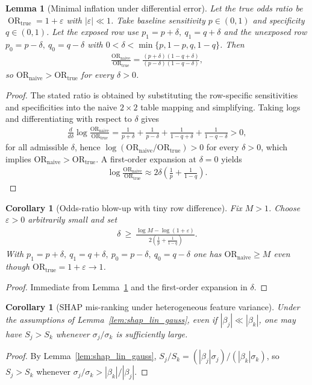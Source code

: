 \documentclass[pdflatex,sn-mathphys-num]{sn-jnl}%
\def\EQSP{3pt}
\newcommand{\cgather}[2][\EQSP]{\begingroup\setlength\abovedisplayskip{#1}\setlength\belowdisplayskip{#1}\begin{gather} #2 \end{gather}\endgroup\noindent}
\theoremstyle{thmstyleone}%
\newtheorem{lemma}[theorem]{Lemma} %
\newtheorem{corollary}[theorem]{Corollary} %
\theoremstyle{thmstyletwo}%
\theoremstyle{thmstylethree}%
\begin{document}
\begin{lemma}[Minimal inflation under differential error]\label{lem:minimal}
Let the true odds ratio be $\operatorname{OR}_{\mathrm{true}}=1+\varepsilon$
with $|\varepsilon|\ll1$.
Take baseline sensitivity $p\in(0,1)$ and specificity $q\in(0,1)$.
Let the exposed row use $p_1=p+\delta,\ q_1=q+\delta$ and the unexposed row
$p_0=p-\delta,\ q_0=q-\delta$ with $0<\delta<\min\{p,1-p,q,1-q\}$.
Then
\cgather{
\frac{\mathrm{OR}_{\text{naive}}}{\mathrm{OR}_{\text{true}}}
= \frac{(p+\delta)(1-q+\delta)}{(p-\delta)(1-q-\delta)} ,
}
so $\mathrm{OR}_{\text{naive}}>\mathrm{OR}_{\text{true}}$ for every $\delta>0$.
\end{lemma}
\begin{proof}
The stated ratio is obtained by substituting the row-specific sensitivities and specificities into the naive $2\times2$ table mapping
and simplifying. Taking logs and differentiating with respect to $\delta$ gives
\cgather{
\frac{d}{d\delta}\log\frac{\mathrm{OR}_{\text{naive}}}{\mathrm{OR}_{\text{true}}}
=
\frac{1}{p+\delta}+\frac{1}{p-\delta}
+
\frac{1}{1-q+\delta}+\frac{1}{1-q-\delta}
>0,
}
for all admissible $\delta$, hence $\log(\mathrm{OR}_{\text{naive}}/\mathrm{OR}_{\text{true}})>0$ for every $\delta>0$,
which implies $\mathrm{OR}_{\text{naive}}>\mathrm{OR}_{\text{true}}$.
A first-order expansion at $\delta=0$ yields
\cgather{
\log\frac{\mathrm{OR}_{\text{naive}}}{\mathrm{OR}_{\text{true}}}
\approx 2\delta\left(\frac{1}{p}+\frac{1}{1-q}\right).
}
\end{proof}
%
\begin{corollary}[Odds-ratio blow-up with tiny row difference]\label{corshap}
Fix $M>1$. Choose $\varepsilon>0$ arbitrarily small and set
\cgather{
\delta \ \ge\ \frac{\log M-\log(1+\varepsilon)}{\,2\left(\frac{1}{p}+\frac{1}{1-q}\right)} .
}
With $p_1=p+\delta,\ q_1=q+\delta,\ p_0=p-\delta,\ q_0=q-\delta$ one has
$\mathrm{OR}_{\text{naive}}\ge M$ even though $\mathrm{OR}_{\text{true}}=1+\varepsilon\to1$.
\end{corollary}
\begin{proof}
Immediate from Lemma~\ref{lem:minimal} and the first-order expansion in $\delta$.
\end{proof}
%
\begin{corollary}[SHAP mis-ranking under heterogeneous feature variance]\label{cor:shap_misrank}
Under the assumptions of Lemma~\ref{lem:shap_lin_gauss}, even if $|\beta_j|\ll|\beta_k|$, one may have $S_j>S_k$
whenever $\sigma_j/\sigma_k$ is sufficiently large.
\end{corollary}
\begin{proof}
By Lemma~\ref{lem:shap_lin_gauss}, $S_j/S_k=(|\beta_j|\sigma_j)/(|\beta_k|\sigma_k)$, so $S_j>S_k$ whenever
$\sigma_j/\sigma_k>|\beta_k|/|\beta_j|$.
\end{proof}
\end{document}

